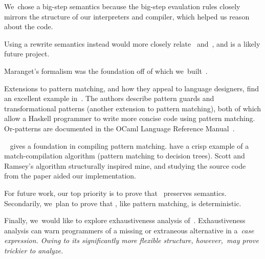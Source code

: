 \documentclass[article,screen,12pt, nonacm]{acmart}
\begin{document}
    
    We~chose a big-step semantics because
    the big-step evaulation rules closely mirrors the structure of our
    interpreters and compiler, which helped us reason about the code. 


    Using a rewrite semantics instead would more closely relate~\VMinus
    and~\VC, and is a likely future project. 
    
    Maranget's formalism was the foundation off of which we~built~\D. 
    
    Extensions to pattern matching, and how they appeal to language designers,
    find an excellent example in~\citet{guardproposal}. The authors describe
    pattern guards and transformational patterns (another extension to pattern
    matching), both of which allow a Haskell programmer to write more concise
    code using pattern matching. Or-patterns are documented in the OCaml
    Language Reference Manual~\citep{ocaml}.
    
    \citet{augustsson1985compiling}~ gives a foundation in compiling pattern
    matching. \citet{scottramsey} have a crisp example of a match-compilation
    algorithm (pattern matching to decision trees). Scott and Ramsey's algorithm
    structurally inspired mine, and studying the source code from the paper
    aided our implementation. 

    For future work, our top priority is to prove that \DTran~preserves
    semantics. Secondarily, we~plan to prove that \VMinus, like pattern
    matching, is deterministic. 

    Finally, we~would like to explore
    exhaustiveness analysis of~\VMinus.
    Exhaustiveness analysis
    can warn programmers of a missing or extraneous alternative in a~\it{case} expression.
    Owing to its significantly more flexible structure,
    however,~\iffibf may prove trickier to analyze.
    
    
    
    
    
    
    
    
    
    
    
    
    
    
    
    
    
        
    
\end{document}
